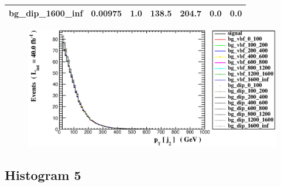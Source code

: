 \documentclass[a4paper, 10pt]{article}
\begin{document}
\begin{table}[H]
\begin{center}
\begin{tabular}{|m{23.0mm}|m{23.0mm}|m{18.0mm}|m{19.0mm}|m{19.0mm}|m{19.0mm}|m{19.0mm}|}
      \hline
      {\cellcolor{white}         bg\_dip\_1600\_inf}& {\cellcolor{white}         0.00975}& {\cellcolor{white}         1.0}& {\cellcolor{white}         138.5}& {\cellcolor{white}         204.7}& {\cellcolor{green}         0.0}& {\cellcolor{green}         0.0}\\
\hline
    \end{tabular}
  \end{center}
\end{table}

\begin{figure}[H]
  \begin{center}
    \includegraphics[scale=0.45]{selection_3.eps}\\
\caption{   }
  \end{center}
\end{figure}
      \newpage
\subsection{ Histogram 5}
\end{document}
